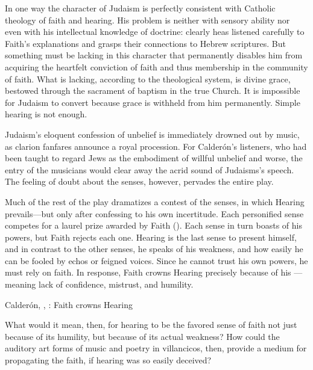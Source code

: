 In one way the character of Judaism is perfectly consistent with Catholic theology of faith and hearing.
His problem is neither with sensory ability nor even with his intellectual knowledge of doctrine: clearly heas listened carefully to Faith's explanations and grasps their connections to Hebrew scriptures.
But something must be lacking in this character that permanently disables him from acquiring the heartfelt conviction of faith and thus membership in the community of faith.
What is lacking, according to the theological system, is divine grace, bestowed through the sacrament of baptism in the true Church.
It is impossible for Judaism to convert because grace is withheld from him permanently.%
Simple hearing is not enough.

Judaism's eloquent confession of unbelief is immediately drowned out by music, as clarion fanfares announce a royal procession.
For Calderón's listeners, who had been taught to regard Jews as the embodiment of willful unbelief and worse, the entry of the musicians would clear away the acrid sound of Judaisms's speech.
The feeling of doubt about the senses, however, pervades the entire play.

Much of the rest of the play dramatizes a contest of the senses, in which Hearing prevails---but only after confessing to his own incertitude.
Each personified sense competes for a laurel prize awarded by Faith ().
Each sense in turn boasts of his powers, but Faith rejects each one.
Hearing is the last sense to present himself, and in contrast to the other senses, he speaks of his weakness, and how easily he can be fooled by echos or feigned voices.
Since he cannot trust his own powers, he must rely on faith.
In response, Faith crowns Hearing precisely because of his ---meaning lack of confidence, mistrust, and humility.

\begin{expoem}
  \caption{Calderón, , : Faith crowns Hearing}
  \label{expoem:Calderon-Retiro-Hearing}
\end{expoem}

What would it mean, then, for hearing to be the favored sense of faith not just because of its humility, but because of its actual weakness?
How could the auditory art forms of music and poetry in villancicos, then, provide a medium for propagating the faith, if hearing was so easily deceived?

